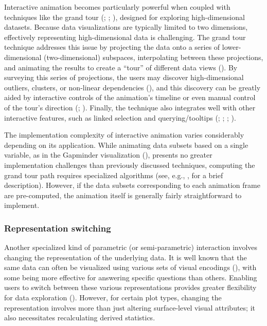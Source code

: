 \documentclass[
]{book}
\begin{document}
Interactive animation becomes particularly powerful when coupled with techniques like the grand tour (; ; ), designed for exploring high-dimensional datasets. Because data visualizations are typically limited to two dimensions, effectively representing high-dimensional data is challenging. The grand tour technique addresses this issue by projecting the data onto a series of lower-dimensional (two-dimensional) subspaces, interpolating between these projections, and animating the results to create a ``tour'' of different data views (). By surveying this series of projections, the users may discover high-dimensional outliers, clusters, or non-linear dependencies (), and this discovery can be greatly aided by interactive controls of the animation's timeline or even manual control of the tour's direction (; ). Finally, the technique also integrates well with other interactive features, such as linked selection and querying/tooltips (; ; ; ).

The implementation complexity of interactive animation varies considerably depending on its application. While animating data subsets based on a single variable, as in the Gapminder visualization (), presents no greater implementation challenges than previously discussed techniques, computing the grand tour path requires specialized algorithms (see, e.g., , for a brief description). However, if the data subsets corresponding to each animation frame are pre-computed, the animation itself is generally fairly straightforward to implement.

\subsubsection{Representation switching}\label{representation-switching}

Another specialized kind of parametric (or semi-parametric) interaction involves changing the representation of the underlying data. It is well known that the same data can often be visualized using various sets of visual encodings (), with some being more effective for answering specific questions than others. Enabling users to switch between these various representations provides greater flexibility for data exploration (). However, for certain plot types, changing the representation involves more than just altering surface-level visual attributes; it also necessitates recalculating derived statistics.
\end{document}
